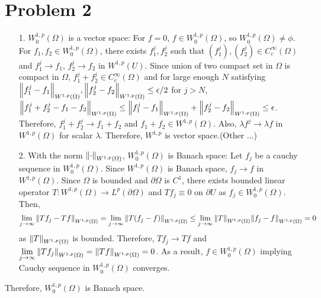 \documentclass{article}
\begin{document}
\section*{Problem 2}
\begin{enumerate}
\item[1.] $W_0^{1,p}(\Omega)$ is a vector space: For $f=0$, $f\in W_0^{1,p}(\Omega)$, so $W_0^{1,p}(\Omega)\neq \phi$. For $f_1, f_2\in W_0^{1,p}(\Omega)$, there exists $f_1^j, f_2^j$ such that $(f_1^j), (f_2^j)\in C_c^\infty (\Omega)$ and $f_1^j\rightarrow f_1$, $f_2^j\rightarrow f_2$ in $W^{1,p}(U)$. Since union of two compact set in $\Omega$ is compact in $\Omega$, $f_1^j+f_2^j\in C_c^\infty(\Omega)$ and for large enough $N$ satisfying $\norm{f_1^j-f_1}_{W^{1,p}(\Omega)} , \norm{f_2^j-f_2}_{W^{1,p}(\Omega)}\leq \epsilon/2$ for $j>N$, $\norm{f_1^j+f_2^j-f_1-f_2}_{W^{1,p}(\Omega)}\leq \norm{f_1^j-f_1}_{W^{1,p}(\Omega)}+\norm{f_2^j-f_2}_{W^{1,p}(\Omega)}\leq \epsilon$. Therefore, $f_1^j+f_2^j\rightarrow f_1+f_2$ and $f_1+f_2\in W^{1,p}(\Omega)$. Also, $\lambda f^j\rightarrow \lambda f$ in $W^{1,p}(\Omega)$ for scalar $\lambda$. Therefore, $W^{1,p}$ is vector space.(Other ...)
\item[2.] With the norm $\norm{\cdot}_{W^{1,p}(\Omega)}$, ${W_0^{1,p}(\Omega)}$ is Banach space: Let $f_j$ be a cauchy sequence in ${W_0^{1,p}(\Omega)}$. Since ${W^{1,p}(\Omega)}$ is Banach space, $f_j\rightarrow f$ in $W^{1,p}(\Omega)$. Since $\Omega$ is bounded and $\partial \Omega$ is $C^1$, there exists bounded linear operator $T:{W^{1,p}(\Omega)}\rightarrow L^p(\partial \Omega)$ and $Tf_j\equiv 0$ on $\partial U$ as $f_j\in {W_0^{1,p}(\Omega)}$. Then,
\begin{equation*}
\lim\limits_{j\rightarrow\infty}\norm{Tf_j-Tf}_{W^{1,p}(\Omega)}=\lim\limits_{j\rightarrow\infty}\norm{T(f_j-f)}_{W^{1,p}(\Omega)}\leq \lim\limits_{j\rightarrow\infty}\norm{T}_{W^{1,p}(\Omega)}\norm{f_j-f}_{W^{1,p}(\Omega)}=0
\end{equation*}
as $\norm{T}_{W^{1,p}(\Omega)}$ is bounded. Therefore, $Tf_j\rightarrow Tf$ and $\lim\limits_{j\rightarrow \infty}\norm{Tf_j}_{W^{1,p}(\Omega)}=\norm{Tf}_{W^{1,p}(\Omega)}=0$. As a result, $f\in W_0^{1,p}(\Omega)$ implying Cauchy sequence in ${W_0^{1,p}(\Omega)}$ converges.
\end{enumerate}
Therefore, $W_0^{1,p}(\Omega)$ is Banach space.
\end{document}
